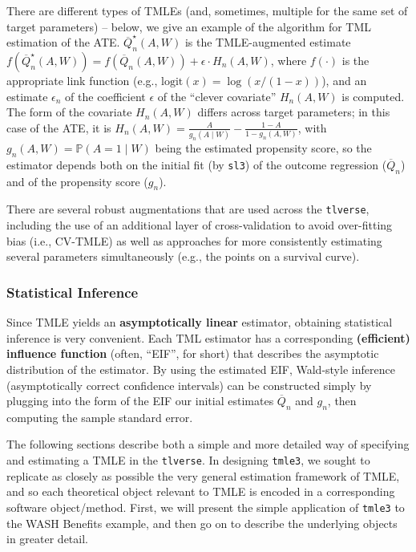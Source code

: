 \documentclass[12pt, krantz2,]{krantz}
\theoremstyle{definition}
\theoremstyle{definition}
\theoremstyle{definition}
\newcommand{\1}{\mathbbm{1}}
\begin{document}
There are different types of TMLEs (and, sometimes, multiple for the same set of
target parameters) -- below, we give an example of the algorithm for TML
estimation of the ATE. \(\overline{Q}^{\star}_n(A,W)\) is the TMLE-augmented
estimate \(f(\overline{Q}^{\star}_n(A,W)) = f(\overline{Q}_n(A,W)) + \epsilon \cdot H_n(A,W)\), where \(f(\cdot)\) is the appropriate link function (e.g.,
\(\text{logit}(x) = \log(x / (1 - x))\)), and an estimate \(\epsilon_n\) of the
coefficient \(\epsilon\) of the ``clever covariate'' \(H_n(A,W)\) is computed. The
form of the covariate \(H_n(A,W)\) differs across target parameters; in this case
of the ATE, it is \(H_n(A,W) = \frac{A}{g_n(A \mid W)} - \frac{1-A}{1-g_n(A, W)}\), with \(g_n(A,W) = \mathbb{P}(A=1 \mid W)\) being the estimated propensity
score, so the estimator depends both on the initial fit (by \texttt{sl3}) of the
outcome regression (\(\overline{Q}_n\)) and of the propensity score (\(g_n\)).

There are several robust augmentations that are used across the \texttt{tlverse},
including the use of an additional layer of cross-validation to avoid
over-fitting bias (i.e., CV-TMLE) as well as approaches for more consistently
estimating several parameters simultaneously (e.g., the points on a survival
curve).

\hypertarget{tmle-infer}{%
\subsubsection{Statistical Inference}\label{tmle-infer}}

Since TMLE yields an \textbf{asymptotically linear} estimator, obtaining statistical
inference is very convenient. Each TML estimator has a corresponding
\textbf{(efficient) influence function} (often, ``EIF'', for short) that describes the
asymptotic distribution of the estimator. By using the estimated EIF, Wald-style
inference (asymptotically correct confidence intervals) can be constructed
simply by plugging into the form of the EIF our initial estimates
\(\overline{Q}_n\) and \(g_n\), then computing the sample standard error.

The following sections describe both a simple and more detailed way of
specifying and estimating a TMLE in the \texttt{tlverse}. In designing \texttt{tmle3}, we
sought to replicate as closely as possible the very general estimation framework
of TMLE, and so each theoretical object relevant to TMLE is encoded in a
corresponding software object/method. First, we will present the simple
application of \texttt{tmle3} to the WASH Benefits example, and then go on to describe
the underlying objects in greater detail.
\end{document}
